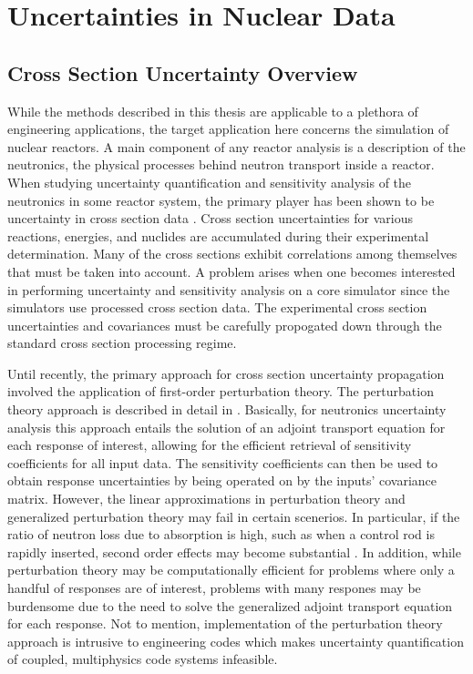 \section{Uncertainties in Nuclear Data}
\label{sec:cross_sec_uncertainties}

\subsection{Cross Section Uncertainty Overview}
\label{subsec:xsec_uq_overview}

While the methods described in this thesis are applicable to a plethora of engineering applications, the target application here concerns the simulation of nuclear reactors. A main component of any reactor analysis is a description of the neutronics, the physical processes behind neutron transport inside a reactor. When studying uncertainty quantification and sensitivity analysis of the neutronics in some reactor system, the primary  player has been shown to be uncertainty in cross section data \cite{Khalik_Turinsky} \cite{Jessee_Khalik_Turinsky}. Cross section uncertainties for various reactions, energies, and nuclides are accumulated during their experimental determination. Many of the cross sections exhibit correlations among themselves that must be taken into account. A problem arises when one becomes interested in performing uncertainty and sensitivity analysis on a core simulator since the simulators use processed cross section data. The experimental cross section uncertainties and covariances must be carefully propogated down through the standard cross section processing regime.   

Until recently, the primary approach for cross section uncertainty propagation involved the application of first-order perturbation theory. The perturbation theory approach is described in detail in \cite{MLWilliams}. Basically, for neutronics uncertainty analysis this approach entails the solution of an adjoint transport equation for each response of interest, allowing for the efficient retrieval of sensitivity coefficients for all input data. The sensitivity coefficients can then be used to obtain response uncertainties by being operated on by the inputs' covariance matrix. However, the linear approximations in perturbation theory and generalized perturbation theory may fail in certain scenerios. In particular, if the ratio of neutron loss due to absorption is high, such as when a control rod is rapidly inserted, second order effects may become substantial \cite{MLWilliams}. In addition, while perturbation theory may be computationally efficient for problems where only a handful of responses are of interest, problems with many respones may be burdensome due to the need to solve the generalized adjoint transport equation for each response. Not to mention, implementation of the perturbation theory approach is intrusive to engineering codes which makes uncertainty quantification of coupled, multiphysics code systems  infeasible.         


